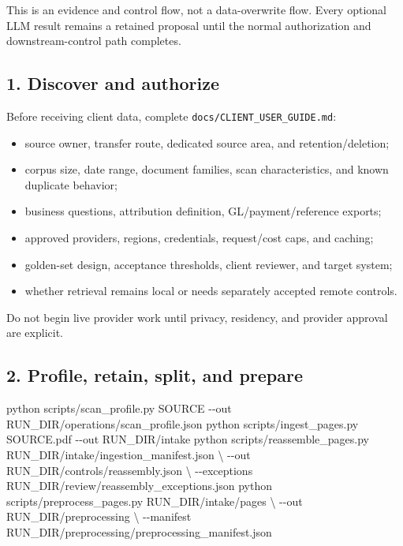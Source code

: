 \documentclass[
]{article}
\newenvironment{Shaded}{}{}
\newcommand{\AttributeTok}[1]{\textcolor[rgb]{0.49,0.56,0.16}{#1}}
\newcommand{\DataTypeTok}[1]{\textcolor[rgb]{0.56,0.13,0.00}{#1}}
\newcommand{\ExtensionTok}[1]{#1}
\newcommand{\NormalTok}[1]{#1}
\providecommand{\tightlist}{%
  \setlength{\itemsep}{0pt}\setlength{\parskip}{0pt}}
\begin{document}
This is an evidence and control flow, not a data-overwrite flow. Every
optional LLM result remains a retained proposal until the normal
authorization and downstream-control path completes.

\subsection{1. Discover and authorize}\label{discover-and-authorize}

Before receiving client data, complete
\texttt{docs/\allowbreak{}CLIENT\_\allowbreak{}USER\_\allowbreak{}GUIDE.md}:

\begin{itemize}
\tightlist
\item
  source owner, transfer route, dedicated source area, and
  retention/deletion;
\item
  corpus size, date range, document families, scan characteristics, and
  known duplicate behavior;
\item
  business questions, attribution definition, GL/payment/reference
  exports;
\item
  approved providers, regions, credentials, request/cost caps, and
  caching;
\item
  golden-set design, acceptance thresholds, client reviewer, and target
  system;
\item
  whether retrieval remains local or needs separately accepted remote
  controls.
\end{itemize}

Do not begin live provider work until privacy, residency, and provider
approval are explicit.

\subsection{2. Profile, retain, split, and
prepare}\label{profile-retain-split-and-prepare}

\begin{Shaded}
\begin{Highlighting}[]
\ExtensionTok{python}\NormalTok{ scripts/scan\_profile.py SOURCE }\AttributeTok{{-}{-}out}\NormalTok{ RUN\_DIR/operations/scan\_profile.json}
\ExtensionTok{python}\NormalTok{ scripts/ingest\_pages.py SOURCE.pdf }\AttributeTok{{-}{-}out}\NormalTok{ RUN\_DIR/intake}
\ExtensionTok{python}\NormalTok{ scripts/reassemble\_pages.py RUN\_DIR/intake/ingestion\_manifest.json }\DataTypeTok{\textbackslash{}}
  \AttributeTok{{-}{-}out}\NormalTok{ RUN\_DIR/controls/reassembly.json }\DataTypeTok{\textbackslash{}}
  \AttributeTok{{-}{-}exceptions}\NormalTok{ RUN\_DIR/review/reassembly\_exceptions.json}
\ExtensionTok{python}\NormalTok{ scripts/preprocess\_pages.py RUN\_DIR/intake/pages }\DataTypeTok{\textbackslash{}}
  \AttributeTok{{-}{-}out}\NormalTok{ RUN\_DIR/preprocessing }\DataTypeTok{\textbackslash{}}
  \AttributeTok{{-}{-}manifest}\NormalTok{ RUN\_DIR/preprocessing/preprocessing\_manifest.json}
\end{Highlighting}
\end{Shaded}
\end{document}
